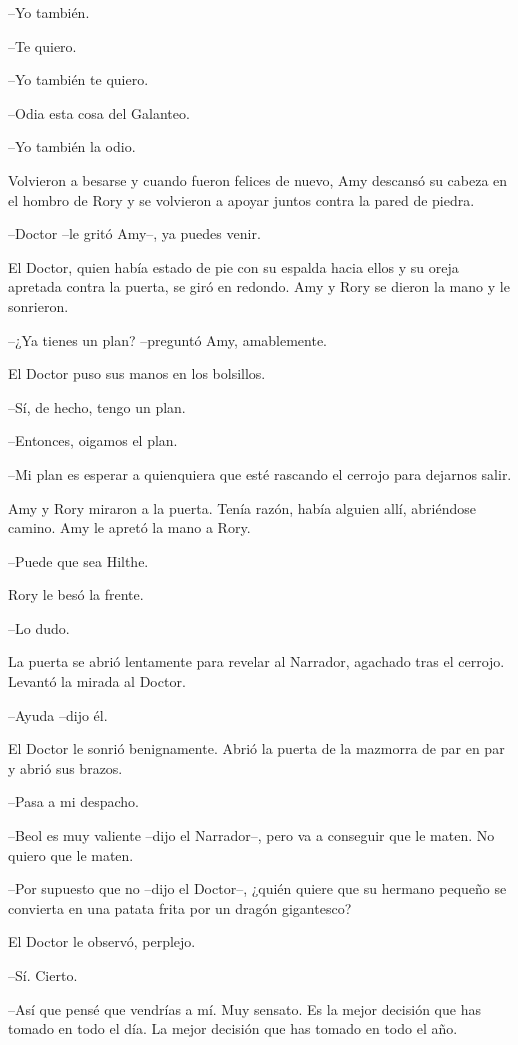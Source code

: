 {--Yo también.}

{--Te quiero.}

{--Yo también te quiero.}

{--Odia esta cosa del Galanteo.}

{--Yo también la odio.}

{Volvieron a besarse y cuando fueron felices de nuevo, Amy descansó su
	cabeza en el hombro de Rory y se volvieron a apoyar juntos contra la
pared de piedra.}

{--Doctor --le gritó Amy--, ya puedes venir.}

{El Doctor, quien había estado de pie con su espalda hacia ellos y su
	oreja apretada contra la puerta, se giró en redondo. Amy y Rory se
dieron la mano y le sonrieron.}

{--¿Ya tienes un plan? --preguntó Amy, amablemente.}

{El Doctor puso sus manos en los bolsillos.}

{--Sí, de hecho, tengo un plan.}

{--Entonces, oigamos el plan.}

{--Mi plan es esperar a quienquiera que esté rascando el cerrojo para
dejarnos salir.}

{Amy y Rory miraron a la puerta. Tenía razón, había alguien allí,
abriéndose camino. Amy le apretó la mano a Rory.}

{--Puede que sea Hilthe.}

{Rory le besó la frente.}

{--Lo dudo.}

{La puerta se abrió lentamente para revelar al Narrador, agachado tras
el cerrojo. Levantó la mirada al Doctor.}

{--Ayuda --dijo él.}

{El Doctor le sonrió benignamente. Abrió la puerta de la mazmorra de par
en par y abrió sus brazos.}

{--Pasa a mi despacho.}

{--Beol es muy valiente --dijo el Narrador--, pero va a conseguir que
le maten. No quiero que le maten.}

{--Por supuesto que no --dijo el Doctor--, ¿quién quiere que su
	hermano pequeño se convierta en una patata frita por un dragón
gigantesco?}

{El Doctor le observó, perplejo.}

{--Sí. Cierto.}

{--Así que pensé que vendrías a mí. Muy sensato. Es la mejor decisión
	que has tomado en todo el día. La mejor decisión que has tomado en todo
el año.}

